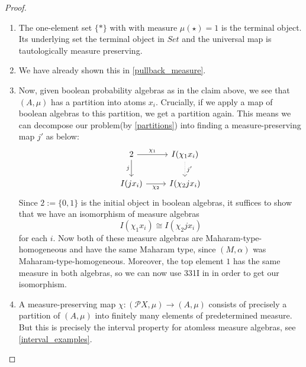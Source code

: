 \documentclass[a4paper]{amsproc}
\theoremstyle{plain}
\theoremstyle{definition}
\theoremstyle{remark}
\numberwithin{equation}{section}
\begin{document}
\begin{proof} 
\begin{enumerate}
\item The one-element set $\{*\}$ with with measure $\mu(\star)=1$ is the terminal object. Its underlying set the terminal object in $Set$ and the universal map is tautologically measure preserving.
\item We have already shown this in \ref{pullback_measure}.
\item
Now, given boolean probability algebras as in the claim above, we see that $(A, \mu)$ has a partition into atoms $x_i$. Crucially, if we apply a map of boolean algebras to this partition, we get a partition again. This means we can decompose our problem(by \ref{partitions}) into finding a measure-preserving map $j'$ as below:
\[
\begin{tikzcd}
2 \arrow[d, "j"'] \arrow[r, "\chi_1"]  & I(\chi_1 x_i) \arrow[d, "j'", dotted] \\
I(j x_i) \arrow[r, "\chi_2"'] & I(\chi_2 j x_i)                      
\end{tikzcd}
\]
Since $2 := \{0, 1\}$ is the initial object in boolean algebras, it suffices to show that we have an isomorphism of measure algebras
\[
I(\chi_1 x_i) \cong I(\chi_2 j x_i)
\]
for each $i$. Now both of these measure algebras are Maharam-type-homogeneous and have the same Maharam type, since $(M, \alpha)$ was Maharam-type-homogeneous. Moreover, the top element $1$ has the same measure in both algebras, so we can now use 331I in \cite{fremlin} in order to get our isomorphism.

\item A measure-preserving map $\chi:(\mathcal{P} X,\mu)\rightarrow (A,\mu)$ consists of precisely a partition of $(A,\mu)$ into finitely many elements of predetermined measure. But this is precisely the interval property for atomless measure algebras, see \ref{interval_examples}.

\end{enumerate}
\end{proof}
\end{document}
